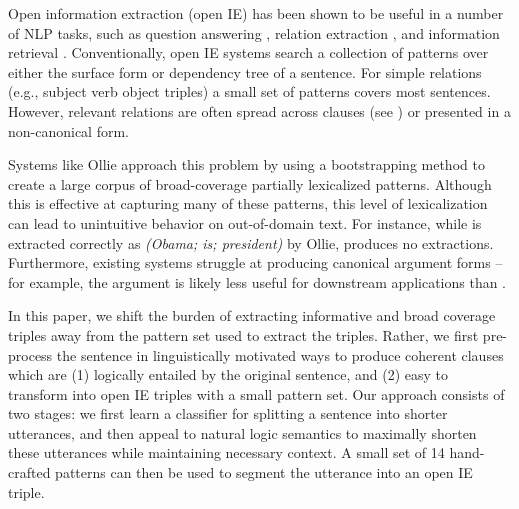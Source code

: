 Open information extraction (open IE) has been shown to be useful in a
  number of NLP tasks, such as question answering \cite{key:2014fader-openqa},
  relation extraction \cite{key:2010soderland-adapting}, 
  and information retrieval \cite{key:2011etzioni-nature}.
Conventionally, open IE systems search a collection of patterns over either
  the surface form or dependency tree of a sentence.
For simple relations (e.g., subject verb object triples) a small set of
  patterns covers most sentences.
However, relevant relations are often spread across clauses (see
  ) or presented in a non-canonical form.

Systems like Ollie \cite{key:2012mausam-ollie} approach this problem by 
  using a bootstrapping method to create a large corpus of broad-coverage
  partially lexicalized patterns.
Although this is effective at capturing many of these patterns,
  this level of lexicalization can lead to unintuitive behavior on 
  out-of-domain text.
For instance, while  is extracted correctly 
  as \textit{(Obama; is; president)} by Ollie,
   produces no extractions.
Furthermore, existing systems struggle at producing
  canonical argument forms -- for example, the argument
   is likely less useful for downstream
  applications than .

In this paper, we shift the burden of extracting informative and broad
  coverage triples away from the pattern set used to extract the triples.
Rather, we first pre-process the sentence in linguistically motivated ways
  to produce coherent clauses which are (1) logically entailed by the 
  original sentence, and (2) easy to transform into open IE triples 
  with a small pattern set.
Our approach consists of two stages:
  we first learn a classifier for splitting a sentence into shorter
  utterances, and then appeal to natural logic semantics to maximally
  shorten these utterances while maintaining necessary context.
A small set of 14 hand-crafted patterns can then be used to segment the
  utterance into an open IE triple.

